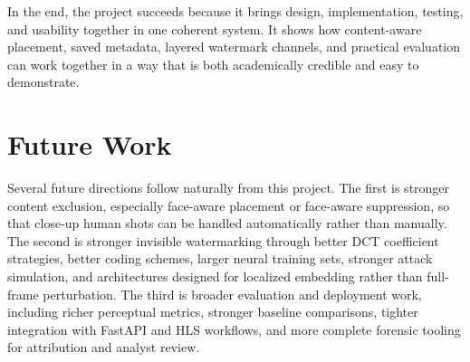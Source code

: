 \documentclass[12pt,oneside]{report}
\begin{document}
In the end, the project succeeds because it brings design, implementation, testing, and usability together in one coherent system. It shows how content-aware placement, saved metadata, layered watermark channels, and practical evaluation can work together in a way that is both academically credible and easy to demonstrate.

\section{Future Work}
Several future directions follow naturally from this project. The first is stronger content exclusion, especially face-aware placement or face-aware suppression, so that close-up human shots can be handled automatically rather than manually. The second is stronger invisible watermarking through better DCT coefficient strategies, better coding schemes, larger neural training sets, stronger attack simulation, and architectures designed for localized embedding rather than full-frame perturbation. The third is broader evaluation and deployment work, including richer perceptual metrics, stronger baseline comparisons, tighter integration with FastAPI and HLS workflows, and more complete forensic tooling for attribution and analyst review.
\end{document}
